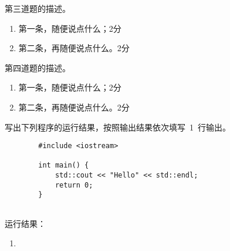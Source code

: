 \documentclass[]{cuzexam}
\begin{document}
\begin{problem}
    第三道题的描述。
\end{problem}

\begin{solution}
    \begin{enumerate}[label=(\arabic*)]
        \item 第一条，随便说点什么；\dotfill 2分
        \item 第二条，再随便说点什么。\dotfill 2分
    \end{enumerate}
\end{solution}

\begin{studentanswer}
    \vspace{28ex}
\end{studentanswer}

\begin{problem}
    第四道题的描述。
\end{problem}

\begin{solution}
    \begin{enumerate}[label=(\arabic*)]
        \item 第一条，随便说点什么；\dotfill 2分
        \item 第二条，再随便说点什么。\dotfill 2分
    \end{enumerate}
\end{solution}

\begin{studentanswer}
    \vspace{28ex}
\end{studentanswer}


\begin{problem}
    写出下列程序的运行结果，按照输出结果依次填写~1~行输出。
    \begin{verbatim}
        #include <iostream>
        
        int main() {
            std::cout << "Hello" << std::endl;
            return 0;
        }
        
    \end{verbatim}
    运行结果：
    \begin{enumerate}[label=(\arabic*),series=cuzafter]
        \item {}
    \end{enumerate}
\end{problem}
\end{document}
